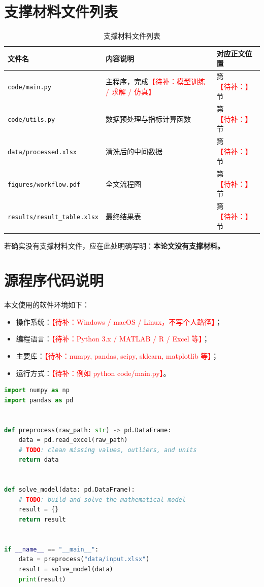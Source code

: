 \documentclass[UTF8,a4paper,zihao=5]{ctexart}
\numberwithin{equation}{section}
\numberwithin{figure}{section}
\numberwithin{table}{section}
\newcommand{\todo}[1]{\textcolor{red}{【待补：#1】}}
\begin{document}
\section{支撑材料文件列表}
\begin{table}[H]
  \centering
  \caption{支撑材料文件列表}
  \begin{tabularx}{\linewidth}{lXX}
    \toprule
    文件名 & 内容说明 & 对应正文位置 \\
    \midrule
    \texttt{code/main.py} & 主程序，完成\todo{模型训练 / 求解 / 仿真} & 第\todo{}节 \\
    \texttt{code/utils.py} & 数据预处理与指标计算函数 & 第\todo{}节 \\
    \texttt{data/processed.xlsx} & 清洗后的中间数据 & 第\todo{}节 \\
    \texttt{figures/workflow.pdf} & 全文流程图 & 第\todo{}节 \\
    \texttt{results/result\_table.xlsx} & 最终结果表 & 第\todo{}节 \\
    \bottomrule
  \end{tabularx}
\end{table}

若确实没有支撑材料文件，应在此处明确写明：\textbf{本论文没有支撑材料。}

\section{源程序代码说明}
本文使用的软件环境如下：
\begin{itemize}
  \item 操作系统：\todo{Windows / macOS / Linux，不写个人路径}；
  \item 编程语言：\todo{Python 3.x / MATLAB / R / Excel 等}；
  \item 主要库：\todo{numpy, pandas, scipy, sklearn, matplotlib 等}；
  \item 运行方式：\todo{例如 python code/main.py}。
\end{itemize}

\begin{lstlisting}[language=Python,caption={核心程序框架示例，正式提交时替换为完整可运行代码}]
import numpy as np
import pandas as pd


def preprocess(raw_path: str) -> pd.DataFrame:
    data = pd.read_excel(raw_path)
    # TODO: clean missing values, outliers, and units
    return data


def solve_model(data: pd.DataFrame):
    # TODO: build and solve the mathematical model
    result = {}
    return result


if __name__ == "__main__":
    data = preprocess("data/input.xlsx")
    result = solve_model(data)
    print(result)
\end{lstlisting}
\end{document}
